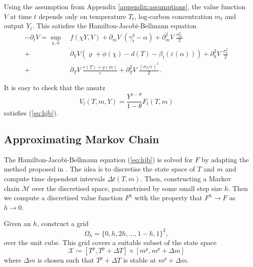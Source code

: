 \documentclass[../../main.tex]{subfiles}
\begin{document}
Using the assumption from Appendix \ref{appendix:assumptions}, the value function $V$ at time $t$ depends only on temperature $T_t$, log-carbon concentration $m_t$ and output $Y_t$. This satisfies the Hamilton-Jacobi-Bellmann equation \begin{equation} \label{eq:hjb}
    \begin{split}
        -\partial_t V = \sup_{\chi, \alpha} \; &f(\chi Y, V) + \partial_m V \; (\gamma^b_t - \alpha) + \partial_m^2 V \; \frac{\sigma_m^2}{2}  \\ 
        + \; &\partial_Y V (\varrho + \phi(\chi) - d(T) - \beta_t(\varepsilon(\alpha))) +  \partial_k^2 V \; \frac{\sigma_k^2}{2} \\
        + \; &\partial_T V \; \frac{r(T) + g(m)}{\epsilon} + \partial_T^2 V \; \frac{(\sigma_T / \epsilon)^2}{2}. 
    \end{split}
\end{equation}

It is easy to check that the ansatz \begin{equation} \label{eq:ansatz}
    V_t(T, m, Y) = \frac{Y^{1 - \theta}}{1 - \theta} F_t(T, m) 
\end{equation} satisfies (\ref{eq:hjb}). 

\subsection{Approximating Markov Chain} \label{appendix:approximating-markov-chain}

The Hamilton-Jacobi-Bellmann equation (\ref{eq:hjb}) is solved for $F$ by adapting the method proposed in \cite{kushner_numerical_2001}. The idea is to discretise the state space of $T$ and $m$ and compute time dependent intervals $\Delta t(T, m)$. Then, constructing a Markov chain $\mathcal{M}$ over the discretised space, parametrised by some small step size $h$. Then we compute a discretised value function $F^h$ with the property that $F^h \to F$ as $h \to 0$.

Given an $h$, construct a grid \begin{equation}
    \Omega_h = \{0, h, 2h, \ldots, 1 - h, 1\}^2,
\end{equation} over the unit cube. This grid covers a suitable subset of the state space \begin{equation}
    \mathcal{X} \coloneqq [T^p, T^p + \Delta T] \times [m^p, m^p + \Delta m] 
\end{equation} where $\Delta m$ is chosen such that $T^p + \Delta T$ is stable at $m^p + \Delta m$.
\end{document}
